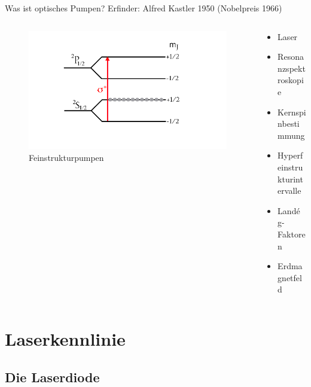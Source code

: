 \documentclass{beamer}
\begin{document}
\begin{frame}{Was ist optisches Pumpen?}
Erfinder: Alfred Kastler 1950 (Nobelpreis 1966)
\begin{columns}
\begin{column}{5cm}
	\begin{figure}[H]
	\includegraphics[width = \textwidth]{Movies/animation2197.png}
	\caption{Feinstrukturpumpen}
	\end{figure}
\end{column}
\begin{column}{5cm}
	\begin{itemize}
	 \item Laser
	 \item Resonanzspektroskopie
	 \item Kernspinbestimmung
	 \item Hyperfeinstrukturintervalle
	 \item Landé g-Faktoren
	 \item Erdmagnetfeld
	\end{itemize}
\end{column}
\end{columns}
\end{frame}


\section{Laserkennlinie} %

\subsection{Die Laserdiode}

\begin{frame}
\begin{center}
\end{center}
\end{frame}
\end{document}
